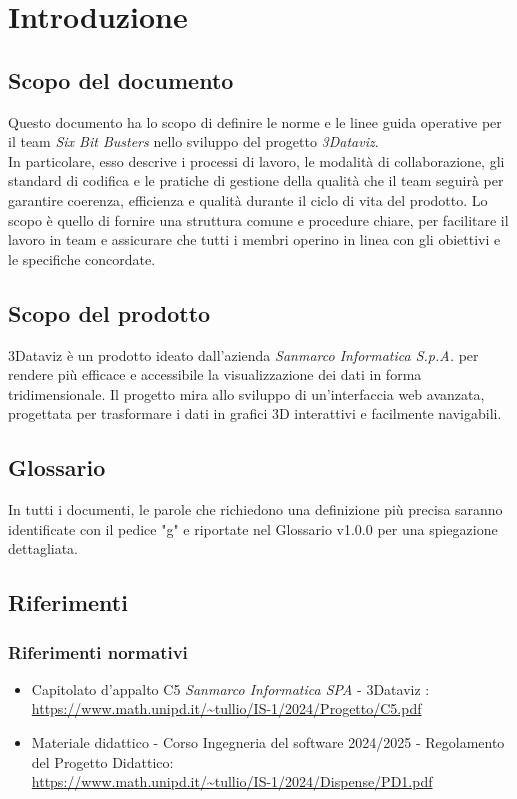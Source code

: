 \section{Introduzione}
    \subsection{Scopo del documento}
        Questo documento ha lo scopo di definire le norme e le linee guida operative
        per il team \textit{Six Bit Busters} nello sviluppo del progetto
        \textit{3Dataviz}.\\ In particolare, esso descrive i processi di lavoro,
        le modalità di collaborazione, gli standard di codifica e le pratiche
        di gestione della qualità che il team seguirà per garantire coerenza, 
        efficienza e qualità durante il ciclo di vita del prodotto. 
        Lo scopo è quello di fornire una struttura comune e procedure chiare, per 
        facilitare il lavoro in team e assicurare che tutti i membri operino in 
        linea con gli obiettivi e le specifiche concordate.

    \subsection{Scopo del prodotto}

   3Dataviz è un prodotto ideato dall'azienda \textit{Sanmarco Informatica S.p.A.} per rendere più efficace e accessibile la visualizzazione dei dati in forma tridimensionale. Il progetto mira allo sviluppo di un’interfaccia web avanzata, progettata per trasformare i dati in grafici 3D interattivi e facilmente navigabili.
        
    \subsection{Glossario}
      In tutti i documenti, le parole che richiedono una definizione più precisa saranno identificate con il pedice "g" e riportate nel Glossario v1.0.0 per una spiegazione dettagliata.
        
    \subsection{Riferimenti}
        \subsubsection{Riferimenti normativi}
        \begin{itemize}
            \item Capitolato d'appalto C5 \textit{Sanmarco Informatica SPA} - 3Dataviz : \\ \url{https://www.math.unipd.it/~tullio/IS-1/2024/Progetto/C5.pdf}
            \item Materiale didattico - Corso Ingegneria del software 2024/2025 - Regolamento del Progetto Didattico: \\ \url{https://www.math.unipd.it/~tullio/IS-1/2024/Dispense/PD1.pdf}
        \end{itemize}
